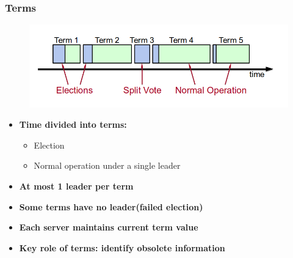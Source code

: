 \begin{frame}
    \frametitle{Terms}
    \begin{figure}
        \centering
        \includegraphics[scale=0.3]{./figures/raft-terms.png}
    \end{figure}
    \begin{itemize}
        \item \textbf{Time divided into terms:}
            \begin{itemize}
                \item Election
                \item Normal operation under a single leader
            \end{itemize}
        \item \textbf{At most 1 leader per term}
        \item \textbf{Some terms have no leader(failed election)}
        \item \textbf{Each server maintains \alert{current term} value}
        \item \textbf{\alert{Key role of terms: identify obsolete information}}
    \end{itemize}
\end{frame}

